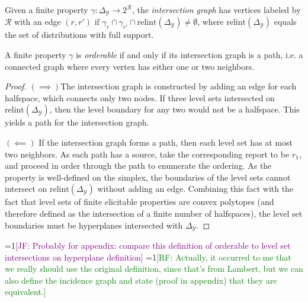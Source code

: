 \documentclass[anon]{colt2020} %
\newcommand{\Comments}{1}
\newcommand{\mynote}[2]{\ifnum\Comments=1\textcolor{#1}{#2}\fi}
\newcommand{\raf}[1]{\mynote{green}{[RF: #1]}}
\newcommand{\jessie}[1]{\mynote{purple}{[JF: #1]}}
\newcommand{\relint}{\mathrm{relint}}
\newcommand{\simplex}{\Delta_\Y}
\newcommand{\R}{\mathcal{R}}
\newcommand{\Y}{\mathcal{Y}}
\newtheorem{observation}{Observation}
\begin{document}
\begin{definition}\label{def:intersection-graph}
Given a finite property $\gamma: \simplex \to 2^{\R}$, the \emph{intersection graph} has vertices labeled by $\R$ with an edge $(r,r')$ if $\gamma_r \cap \gamma_{r'} \cap \relint(\simplex) \neq \emptyset$, where $\relint(\simplex)$ equals the set of distributions with full support.
\end{definition}
\begin{proposition}
  A finite property $\gamma$ is \emph{orderable} if and only if its intersection graph is a path, i.e. a connected graph where every vertex has either one or two neighbors.
\end{proposition}
\begin{proof}
  $(\implies)$The intersection graph is constructed by adding an edge for each halfspace, which connects only two nodes.
  If three level sets intersected on $\relint(\simplex)$, then the level boundary for any two would not be a halfspace.
  This yields a path for the intersection graph.
  
  \bigskip
  $(\impliedby)$ If the intersection graph forms a path, then each level set has at most two neighbors.
  As each path has a source, take the corresponding report to be $r_1$, and proceed in order through the path to enumerate the ordering.
  As the property is well-defined on the simplex, the boundaries of the level sets cannot intersect on $\relint(\simplex)$ without adding an edge.
  Combining this fact with the fact that level sets of finite elicitable properties are convex polytopes (and therefore defined as the intersection of a finite number of halfspaces), the level set boundaries must be hyperplanes intersected with $\simplex$. 
\end{proof}

\jessie{Probably for appendix: compare this definition of orderable to level set intersections on hyperplane definition}
\raf{Actually, it occurred to me that we really should use the original definition, since that's from Lambert, but we can also define the incidence graph and state (proof in appendix) that they are equivalent.}
\end{document}
